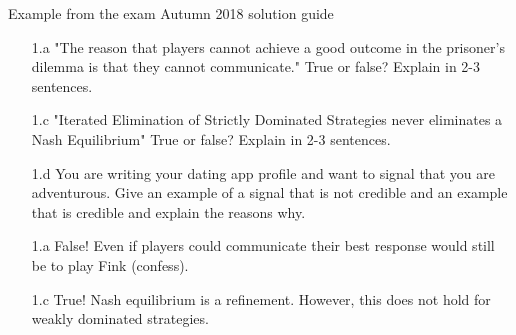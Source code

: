 \begin{frame}{Example from the exam Autumn 2018 solution guide}
\begin{multicols}{2}\color{lightgray}
  \begin{itemize}\color{lightgray}
    \item[\color{lightgray}1.a] "The reason that players cannot achieve a good outcome in the prisoner’s dilemma is that they cannot communicate." True or false? Explain in 2-3 sentences.
    \item[1.c] \color{black}"Iterated Elimination of Strictly Dominated Strategies never eliminates a Nash Equilibrium" True or false? Explain in 2-3 sentences.
    \item[\color{lightgray}1.d] \color{lightgray}You are writing your dating app profile and want to signal that you are adventurous. Give an example of a signal that is not credible and an example that is credible and explain the reasons why.
  \end{itemize}
\vfill\null \columnbreak
\begin{itemize}\color{lightgray}
  \item[\color{lightgray}1.a] False! Even if players could communicate their best response would still be to play Fink (confess).
  \item[1.c] \color{black}True! Nash equilibrium is a refinement. However, this does not hold for weakly dominated strategies.
\end{itemize}
\end{multicols}
\end{frame}

